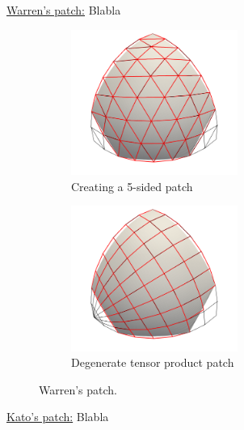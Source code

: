 \documentclass{article}
\begin{document}
\vspace{10pt}
\noindent\underline{Warren's patch:}\vspace{0.2em}\newline
Blabla
\begin{figure}[h!]
  \label{fig:warren}
  \begin{subfigure}{0.45\textwidth}
    \label{fig:warren-cnet}
    \centering
    \includegraphics[width = 0.6\textwidth]{images/warren-cnet.png}
    \caption{Creating a 5-sided patch}
  \end{subfigure}
  \begin{subfigure}{0.45\textwidth}
    \label{fig:warren-quad}
    \centering
    \includegraphics[width = 0.6\textwidth]{images/warren-quad.png}
    \caption{Degenerate tensor product patch}
  \end{subfigure}
  \caption{Warren's patch.}
\end{figure}

\vspace{10pt}
\noindent\underline{Kato's patch:}\vspace{0.2em}\newline
Blabla
\end{document}
